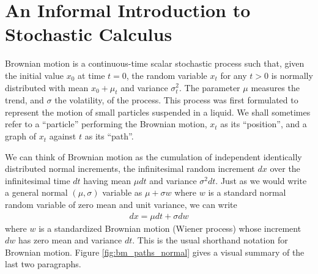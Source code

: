 \documentclass[\topdir/lecture\_notes.tex]{subfiles}
\begin{document}
\section{An Informal Introduction to Stochastic Calculus}
Brownian motion is a continuous-time scalar stochastic process such that, given the initial value $x_{0}$ at time $t=0$, the random variable $x_{t}$ for any $t>0$ is normally distributed with mean $x_{0}+\mu_t$ and variance $\sigma^{2}_t$. The parameter $\mu$ measures the trend, and $\sigma$ the volatility, of the process. This process was first formulated to represent the motion of small particles suspended in a liquid. We shall sometimes refer to a ``particle'' performing the Brownian motion, $x_{t}$ as its ``position'', and a graph of $x_{t}$ against $t$ as its ``path''.

We can think of Brownian motion as the cumulation of independent identically distributed normal increments, the infinitesimal random increment $dx$ over the infinitesimal time $dt$ having mean $\mu dt$ and variance $\sigma^{2} dt$. Just as we would write a general normal $(\mu, \sigma)$ variable as $\mu+\sigma w$ where $w$ is a standard normal random variable of zero mean and unit variance, we can write
\begin{align}
dx=\mu dt+\sigma dw \label{eq:brownian_motion}
\end{align}
where $w$ is a standardized Brownian motion (Wiener process) whose increment $dw$ has zero mean and variance $dt$. This is the usual shorthand notation for Brownian motion. Figure \ref{fig:bm_paths_normal} gives a visual summary of the last two paragraphs.
\end{document}
